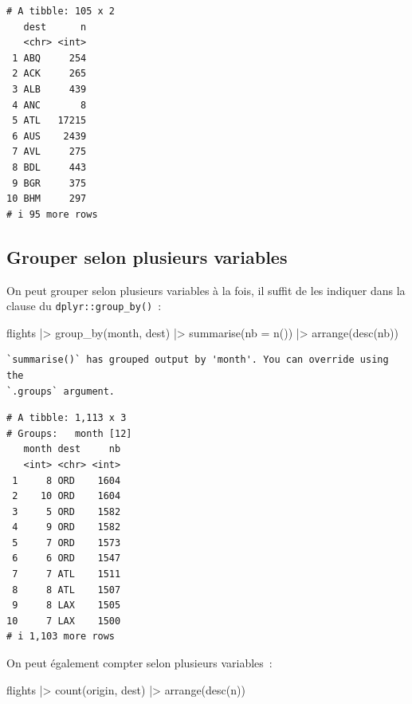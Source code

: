 \documentclass[
  letterpaper,
  DIV=11,
  numbers=noendperiod,
  oneside]{scrreprt}
\newenvironment{Shaded}{\begin{snugshade}}{\end{snugshade}}
\newcommand{\AttributeTok}[1]{\textcolor[rgb]{0.40,0.45,0.13}{#1}}
\newcommand{\FunctionTok}[1]{\textcolor[rgb]{0.28,0.35,0.67}{#1}}
\newcommand{\NormalTok}[1]{\textcolor[rgb]{0.00,0.23,0.31}{#1}}
\newcommand{\SpecialCharTok}[1]{\textcolor[rgb]{0.37,0.37,0.37}{#1}}
\begin{document}
\begin{verbatim}
# A tibble: 105 x 2
   dest      n
   <chr> <int>
 1 ABQ     254
 2 ACK     265
 3 ALB     439
 4 ANC       8
 5 ATL   17215
 6 AUS    2439
 7 AVL     275
 8 BDL     443
 9 BGR     375
10 BHM     297
# i 95 more rows
\end{verbatim}

\hypertarget{grouper-selon-plusieurs-variables}{%
\subsection{Grouper selon plusieurs
variables}\label{grouper-selon-plusieurs-variables}}

On peut grouper selon plusieurs variables à la fois, il suffit de les
indiquer dans la clause du \texttt{dplyr::group\_by()}~:

\begin{Shaded}
\begin{Highlighting}[]
\NormalTok{flights }\SpecialCharTok{|\textgreater{}}
  \FunctionTok{group\_by}\NormalTok{(month, dest) }\SpecialCharTok{|\textgreater{}}
  \FunctionTok{summarise}\NormalTok{(}\AttributeTok{nb =} \FunctionTok{n}\NormalTok{()) }\SpecialCharTok{|\textgreater{}}
  \FunctionTok{arrange}\NormalTok{(}\FunctionTok{desc}\NormalTok{(nb))}
\end{Highlighting}
\end{Shaded}

\begin{verbatim}
`summarise()` has grouped output by 'month'. You can override using the
`.groups` argument.
\end{verbatim}

\begin{verbatim}
# A tibble: 1,113 x 3
# Groups:   month [12]
   month dest     nb
   <int> <chr> <int>
 1     8 ORD    1604
 2    10 ORD    1604
 3     5 ORD    1582
 4     9 ORD    1582
 5     7 ORD    1573
 6     6 ORD    1547
 7     7 ATL    1511
 8     8 ATL    1507
 9     8 LAX    1505
10     7 LAX    1500
# i 1,103 more rows
\end{verbatim}

On peut également compter selon plusieurs variables~:

\begin{Shaded}
\begin{Highlighting}[]
\NormalTok{flights }\SpecialCharTok{|\textgreater{}} 
  \FunctionTok{count}\NormalTok{(origin, dest) }\SpecialCharTok{|\textgreater{}} 
  \FunctionTok{arrange}\NormalTok{(}\FunctionTok{desc}\NormalTok{(n))}
\end{Highlighting}
\end{Shaded}
\end{document}
